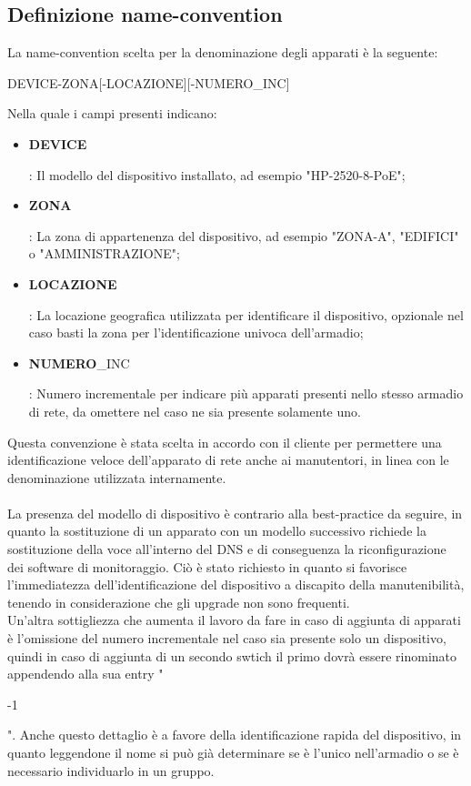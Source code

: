 \documentclass[Tesi.tex]{subfiles}
\begin{document}
\subsection{Definizione name-convention}
La name-convention scelta per la denominazione degli apparati è la seguente:\\
{ \centering
\begin{ttfamily}
	\large DEVICE-ZONA[-LOCAZIONE][-NUMERO\_INC]\\
\end{ttfamily}
}
\medskip
Nella quale i campi presenti indicano: 
\begin{itemize}
	\item  \begin{ttfamily}\textbf{DEVICE}\end{ttfamily}: Il modello del dispositivo installato, ad esempio "HP-2520-8-PoE";
	\item  \begin{ttfamily}\textbf{ZONA}\end{ttfamily}: La zona di appartenenza del dispositivo, ad esempio "ZONA-A", "EDIFICI" o "AMMINISTRAZIONE";
	\item  \begin{ttfamily}\textbf{LOCAZIONE}\end{ttfamily}: La locazione geografica utilizzata per identificare il dispositivo, opzionale nel caso basti la zona per l'identificazione univoca dell'armadio;
	\item  \begin{ttfamily}\textbf{NUMERO}\_INC\end{ttfamily}: Numero incrementale per indicare più apparati presenti nello stesso armadio di rete, da omettere nel caso ne sia presente solamente uno.
\end{itemize}

Questa convenzione è stata scelta in accordo con il cliente per permettere una identificazione veloce dell'apparato di rete anche ai manutentori, in linea con le denominazione utilizzata internamente. \\\\
La presenza del modello di dispositivo è contrario alla best-practice da seguire, in quanto la sostituzione di un apparato con un modello successivo richiede la sostituzione della voce all'interno del DNS e di conseguenza la riconfigurazione dei software di monitoraggio. Ciò è stato richiesto in quanto si favorisce l'immediatezza dell'identificazione del dispositivo a discapito della manutenibilità, tenendo in considerazione che gli upgrade non sono frequenti. \\
Un'altra sottigliezza che aumenta il lavoro da fare in caso di aggiunta di apparati è l'omissione del numero incrementale nel caso sia presente solo un dispositivo, quindi in caso di aggiunta di un secondo swtich il primo dovrà essere rinominato appendendo alla sua entry "\begin{ttfamily}-1\end{ttfamily}". Anche questo dettaglio è a favore della identificazione rapida del dispositivo, in quanto leggendone il nome si può già determinare se è l'unico nell'armadio o se è necessario individuarlo in un gruppo.\\
\end{document}
